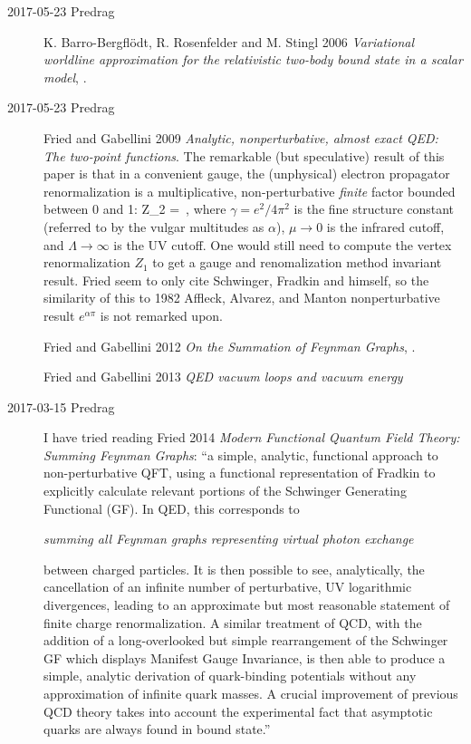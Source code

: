 \begin{description}
\item[2017-05-23 Predrag]
K. Barro-Bergfl\"odt, R. Rosenfelder and M. Stingl 2006 {\em
Variational worldline approximation for the relativistic two-body bound
state in a scalar model}, .

\item[2017-05-23 Predrag]
Fried and Gabellini 2009
{\em Analytic, nonperturbative, almost exact {QED: The} two-point functions}.
The remarkable (but speculative) result of this paper is that in a
convenient gauge, the (unphysical) electron propagator renormalization is
a multiplicative, non-perturbative \emph{finite} factor bounded between 0
and 1:
\beq
Z_2 = \exp{}
\,,
where $\gamma = e^2/4\pi^2$ is the fine structure constant (referred to
by the vulgar multitudes as $\alpha$), $\mu\to 0$ is the infrared cutoff,
and $\Lambda\to\infty$ is the UV cutoff. One would still need to compute
the vertex renormalization $Z_1$ to get a gauge and renomalization method
invariant result. Fried seem to only cite Schwinger, Fradkin and himself,
so the similarity of this to 1982 Affleck, Alvarez, and
Manton nonperturbative result $e^{\alpha\pi}$ is not
remarked upon.

Fried and Gabellini 2012
{\em On the Summation of Feynman Graphs}, .

Fried and Gabellini 2013
{\em {QED} vacuum loops and vacuum energy}

\item[2017-03-15 Predrag] I have tried reading
Fried 2014
{\em Modern Functional Quantum Field Theory: Summing Feynman Graphs}:
``a simple, analytic, functional approach to non-perturbative QFT, using a
functional representation of Fradkin to explicitly
calculate relevant portions of the Schwinger Generating Functional (GF).
In QED, this corresponds to

\emph{summing all Feynman graphs representing virtual photon exchange}

between charged particles. It is then possible to
see, analytically, the cancellation of an infinite number of
perturbative, UV logarithmic divergences, leading to an approximate but
most reasonable statement of finite charge renormalization. A similar
treatment of QCD, with the addition of a long-overlooked but simple
rearrangement of the Schwinger GF which displays Manifest Gauge
Invariance, is then able to produce a simple, analytic derivation of
quark-binding potentials without any approximation of infinite quark
masses. A crucial improvement of previous QCD theory takes into account
the experimental fact that asymptotic quarks are always found in bound
state.''


\end{description}
